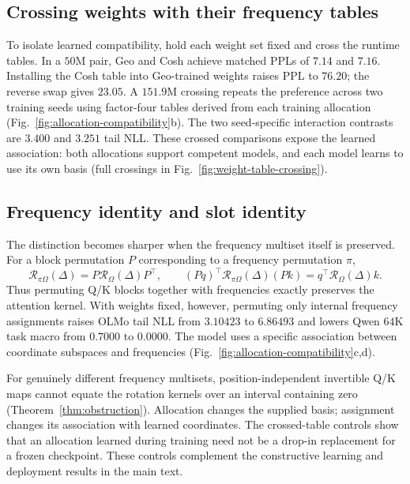 \subsection{Crossing weights with their frequency tables}
\label{sec:coadaptation-finding}

To isolate learned compatibility, hold each weight set fixed and cross the runtime tables. In a $50$M pair, Geo and Cosh achieve matched PPLs of $7.14$ and $7.16$. Installing the Cosh table into Geo-trained weights raises PPL to $76.20$; the reverse swap gives $23.05$. A $151.9$M crossing repeats the preference across two training seeds using factor-four tables derived from each training allocation (Fig.~\ref{fig:allocation-compatibility}b). The two seed-specific interaction contrasts are $3.400$ and $3.251$ tail NLL. These crossed comparisons expose the learned association: both allocations support competent models, and each model learns to use its own basis (full crossings in Fig.~\ref{fig:weight-table-crossing}).

\subsection{Frequency identity and slot identity}
\label{sec:non-identifiability}

The distinction becomes sharper when the frequency multiset itself is preserved. For a block permutation $P$ corresponding to a frequency permutation $\pi$,
\begin{equation}
\mathcal R_{\pi\Omega}(\Delta)=P\mathcal R_\Omega(\Delta)P^\top,
\qquad (Pq)^\top\mathcal R_{\pi\Omega}(\Delta)(Pk)=q^\top\mathcal R_\Omega(\Delta)k.
\label{eq:slot-permutation}
\end{equation}
Thus permuting Q/K blocks together with frequencies exactly preserves the attention kernel. With weights fixed, however, permuting only internal frequency assignments raises OLMo tail NLL from $3.10423$ to $6.86493$ and lowers Qwen $64$K task macro from $0.7000$ to $0.0000$. The model uses a specific association between coordinate subspaces and frequencies (Fig.~\ref{fig:allocation-compatibility}c,d).

For genuinely different frequency multisets, position-independent invertible Q/K maps cannot equate the rotation kernels over an interval containing zero (Theorem~\ref{thm:obstruction}). Allocation changes the supplied basis; assignment changes its association with learned coordinates. The crossed-table controls show that an allocation learned during training need not be a drop-in replacement for a frozen checkpoint. These controls complement the constructive learning and deployment results in the main text.
\FloatBarrier
